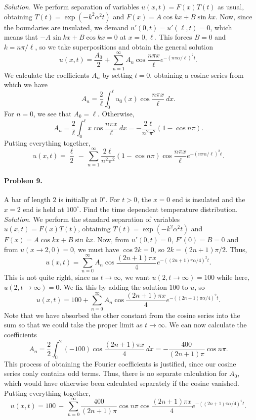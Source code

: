\documentclass[10pt]{article}
\begin{document}
        \textit{Solution.} We perform separation of variables $u(x, t) = F(x)T(t)$ as usual, obtaining $T(t) = \exp(-k^2\alpha^2 t)$ and
        $F(x) = A\cos{kx} + B\sin{kx}$. Now, since the boundaries are insulated, we demand $u'(0, t) = u'(\ell, t) = 0$, which means that
        $-A\sin{kx} + B\cos{kx} = 0$ at $x = 0, \ell$. This forces $B = 0$ and $k = n\pi /\ell$, so we take superpositions
        and obtain the general solution
        \[
                u(x, t) = \frac{A_0}{2} + \sum_{n = 1}^\infty A_n \cos\frac{n\pi x}{\ell} e^{-(n\pi \alpha /\ell)^2 t}.
        \]
        We calculate the coefficients $A_n$ by setting $t = 0$, obtaining a cosine series from which we have
        \[
                A_n = \frac{2}{\ell} \int_0^\ell u_0(x)\cos\frac{n\pi x}{\ell}\:dx.
        \]
        For $n = 0$, we see that $A_0 = \ell$. Otherwise,
        \[
                A_n = \frac{2}{\ell}\int_0^\ell x\cos\frac{n\pi x}{\ell}\:dx = -\frac{2\ell}{n^2\pi^2}(1 - \cos{n\pi}).
        \]
        Putting everything together,
        \[
                u(x, t) = \frac{\ell}{2} \,-\, 
                        \sum_{n = 1}^\infty \frac{2\ell}{n^2\pi^2}(1 - \cos{n\pi})\cos\frac{n\pi x}{\ell} e^{-(n\pi \alpha /\ell)^2 t}.
        \]

        \paragraph{Problem 9.} A bar of length $2$ is initially at $0^\circ$. For $t > 0$, the $x = 0$ end is insulated and the $x = 2$ end is 
        held at $100^\circ$. Find the time dependent temperature distribution. \\

        \textit{Solution.} We perform the standard separation of variables $u(x, t) = F(x)T(t)$, obtaining $T(t) = \exp(-k^2\alpha^2 t)$
        and $F(x) = A\cos{kx} + B\sin{kx}$. Now, from $u'(0, t) = 0$, $F'(0) = B = 0$ and from $u(x\to 2, 0) = 0$, we must have $\cos{2k} = 0$,
        so $2k = (2n + 1)\pi /2$. Thus,
        \[
                u(x, t) = \sum_{n = 0}^\infty A_n \cos\frac{(2n + 1)\pi x}{4} e^{-((2n + 1)\pi \alpha /4)^2 t}.
        \]
        This is not quite right, since as $t \to \infty$, we want $u(2, t\to \infty) = 100$ while here, $u(2, t \to \infty) = 0$.
        We fix this by adding the solution $100$ to $u$, so
        \[
                u(x, t) = 100 + \sum_{n = 0}^\infty A_n \cos\frac{(2n + 1)\pi x}{4} e^{-((2n + 1)\pi \alpha /4)^2 t}.
        \]
        Note that we have absorbed the other constant from the cosine series into the sum so that we could take the proper limit as $t \to \infty$.
        We can now calculate the coefficients
        \[
                A_n = \frac{2}{2}\int_0^2 (-100)\cos\frac{(2n + 1)\pi x}{4}\:dx = -\frac{400}{(2n + 1)\pi}\cos{n\pi}.
        \]
        This process of obtaining the Fourier coefficients is justified, since our cosine series conly contains odd terms.
        Thus, there is no separate calculation for $A_0$, which would have otherwise been calculated separately if the cosine vanished.
        Putting everything together,
        \[
                u(x, t) = 100 \,-\, \sum_{n = 0}^\infty \frac{400}{(2n + 1)\pi}\cos{n\pi} \cos\frac{(2n + 1)\pi x}{4} e^{-((2n + 1)\pi \alpha /4)^2 t}.
        \]
\end{document}
